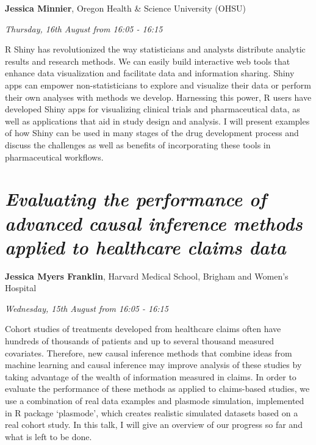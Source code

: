 \documentclass[]{book}
\theoremstyle{definition}
\theoremstyle{definition}
\theoremstyle{definition}
\theoremstyle{remark}
\begin{document}
\textbf{Jessica Minnier}, Oregon Health \& Science University (OHSU)

\emph{Thursday, 16th August from 16:05 - 16:15}

R Shiny has revolutionized the way statisticians and analysts distribute
analytic results and research methods. We can easily build interactive
web tools that enhance data visualization and facilitate data and
information sharing. Shiny apps can empower non-statisticians to explore
and visualize their data or perform their own analyses with methods we
develop. Harnessing this power, R users have developed Shiny apps for
visualizing clinical trials and pharmaceutical data, as well as
applications that aid in study design and analysis. I will present
examples of how Shiny can be used in many stages of the drug development
process and discuss the challenges as well as benefits of incorporating
these tools in pharmaceutical workflows.

\hypertarget{evaluating-the-performance-of-advanced-causal-inference-methods-applied-to-healthcare-claims-data}{%
\section{\texorpdfstring{\emph{Evaluating the performance of advanced
causal inference methods applied to healthcare claims
data}}{Evaluating the performance of advanced causal inference methods applied to healthcare claims data}}\label{evaluating-the-performance-of-advanced-causal-inference-methods-applied-to-healthcare-claims-data}}

\textbf{Jessica Myers Franklin}, Harvard Medical School, Brigham and
Women's Hospital

\emph{Wednesday, 15th August from 16:05 - 16:15}

Cohort studies of treatments developed from healthcare claims often have
hundreds of thousands of patients and up to several thousand measured
covariates. Therefore, new causal inference methods that combine ideas
from machine learning and causal inference may improve analysis of these
studies by taking advantage of the wealth of information measured in
claims. In order to evaluate the performance of these methods as applied
to claims-based studies, we use a combination of real data examples and
plasmode simulation, implemented in R package `plasmode', which creates
realistic simulated datasets based on a real cohort study. In this talk,
I will give an overview of our progress so far and what is left to be
done.
\end{document}

